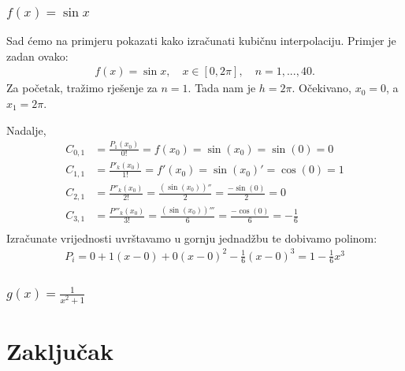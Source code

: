 \documentclass[12pt,a4paper]{report}
\begin{document}
		
		


		\subsection{$f(x)=\sin x$}
		Sad ćemo na primjeru pokazati kako izračunati kubičnu interpolaciju. Primjer je zadan ovako:
		\begin{align*}
			f(x)=\sin x, \quad x\in [0, 2\pi], \quad n=1,...,40.
		\end{align*}
		Za početak, tražimo rješenje za $n=1$. Tada nam je $h=2\pi$. Očekivano, $x_0 = 0$, a $x_1 = 2\pi$.  
		
		Nadalje,
		\begin{align*}
			C_{0,1}&=\frac{P_1(x_0)}{0!}=f(x_0)=\sin (x_0)=\sin (0) = 0\\
			C_{1,1}&=\frac{P'_k(x_0)}{1!}=f'(x_0)=\sin(x_0)'=\cos(0) =1\\
			C_{2, 1}&=\frac{P''_k(x_0)}{2!}=\frac{(\sin (x_0))''}{2}=\frac{-\sin(0)}{2}=0\\
			C_{3, 1}&=\frac{P'''_k(x_0)}{3!}=\frac{(\sin (x_0))'''}{6}=\frac{-\cos(0)}{6}=-\frac{1}{6}\\
		\end{align*}
		Izračunate vrijednosti uvrštavamo u gornju jednadžbu te dobivamo polinom:
		\begin{align*}
			P_i=0+1(x-0)+0(x-0)^2-\frac{1}{6}(x-0)^3 = 1-\frac{1}{6}x^3
		\end{align*}
		
		\subsection{$g(x)=\frac{1}{x^2 +1}$}
\chapter{Zaključak}
\end{document}

